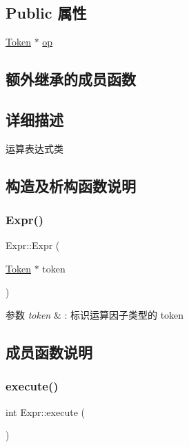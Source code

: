 \subsection*{Public 属性}
\begin{DoxyCompactItemize}
\item 
\hyperlink{class_token}{Token} $\ast$ \hyperlink{class_expr_a5fd7721b7843686e3ec7e63fddf95644}{op}
\end{DoxyCompactItemize}
\subsection*{额外继承的成员函数}


\subsection{详细描述}
运算表达式类 

\subsection{构造及析构函数说明}
\mbox{\label{class_expr_a5a045d68e601c2e782e1958d55a07400}} 
\subsubsection{\texorpdfstring{Expr()}{Expr()}}
{\footnotesize\ttfamily Expr\+::\+Expr (\begin{DoxyParamCaption}\item[{\hyperlink{class_token}{Token} $\ast$}]{token }\end{DoxyParamCaption})}


\begin{DoxyParams}{参数}
{\em token} & \+: 标识运算因子类型的 token \\
\hline
\end{DoxyParams}


\subsection{成员函数说明}
\mbox{\label{class_expr_aff6a2e6eaa460e2a3db28ebdab089b51}} 
\subsubsection{\texorpdfstring{execute()}{execute()}}
{\footnotesize\ttfamily int Expr\+::execute (\begin{DoxyParamCaption}{ }\end{DoxyParamCaption})\hspace{0.3cm}{\ttfamily [virtual]}}

